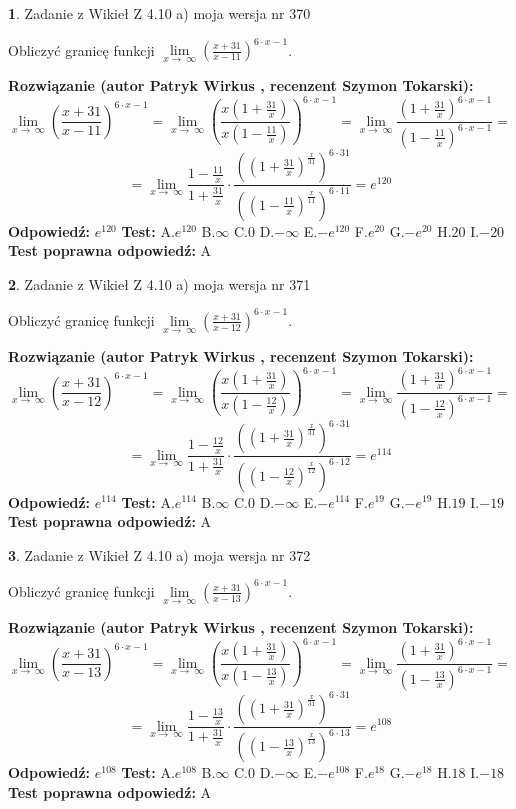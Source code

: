 \documentclass[12pt, a4paper]{article}
\theoremstyle{definition} %
\newtheorem{zad}{}
\newcommand{\zadStart}[1]{\begin{zad}#1\newline}
\newcommand{\zadStop}{\end{zad}}
\newcommand{\rozwStart}[2]{\noindent \textbf{Rozwiązanie (autor #1 , recenzent #2): }\newline}
\newcommand{\rozwStop}{\newline}
\newcommand{\odpStart}{\noindent \textbf{Odpowiedź:}\newline}
\newcommand{\odpStop}{\newline}
\newcommand{\testStart}{\noindent \textbf{Test:}\newline}
\newcommand{\testStop}{\newline}
\newcommand{\kluczStart}{\noindent \textbf{Test poprawna odpowiedź:}\newline}
\newcommand{\kluczStop}{\newline}
\begin{document}
\zadStart{Zadanie z Wikieł Z 4.10 a) moja wersja nr 370}

Obliczyć granicę funkcji  $\lim\limits_{x\to\ \infty}(\frac{x+31}{x-11})^{6\cdot x-1}$.
\zadStop
\rozwStart{Patryk Wirkus}{Szymon Tokarski}
$$\lim\limits_{x\to\ \infty}(\frac{x+31}{x-11})^{6\cdot x-1} = \lim\limits_{x\to\ \infty}(\frac{x(1+\frac{31}{x})}{x(1-\frac{11}{x})})^{6\cdot x-1}=\lim\limits_{x\to\ \infty}\frac{(1+\frac{31}{x})^{6\cdot x-1}}{(1-\frac{11}{x})^{6\cdot x-1}}=$$
$$=\lim\limits_{x\to\ \infty}\frac{1-\frac{11}{x}}{1+\frac{31}{x}}\cdot\frac{((1+\frac{31}{x})^{\frac{x}{31}})^{6\cdot31}}{((1-\frac{11}{x})^{\frac{x}{11}})^{6\cdot11}}=e^{120}$$
\rozwStop
\odpStart
$e^{120}$
\odpStop
\testStart
A.$e^{120}$ B.$\infty$ C.$0$ D.$-\infty$ E.$-e^{120}$
F.$e^{20}$ G.$-e^{20}$
H.$20$
I.$-20$
\testStop
\kluczStart
A
\kluczStop



\zadStart{Zadanie z Wikieł Z 4.10 a) moja wersja nr 371}

Obliczyć granicę funkcji  $\lim\limits_{x\to\ \infty}(\frac{x+31}{x-12})^{6\cdot x-1}$.
\zadStop
\rozwStart{Patryk Wirkus}{Szymon Tokarski}
$$\lim\limits_{x\to\ \infty}(\frac{x+31}{x-12})^{6\cdot x-1} = \lim\limits_{x\to\ \infty}(\frac{x(1+\frac{31}{x})}{x(1-\frac{12}{x})})^{6\cdot x-1}=\lim\limits_{x\to\ \infty}\frac{(1+\frac{31}{x})^{6\cdot x-1}}{(1-\frac{12}{x})^{6\cdot x-1}}=$$
$$=\lim\limits_{x\to\ \infty}\frac{1-\frac{12}{x}}{1+\frac{31}{x}}\cdot\frac{((1+\frac{31}{x})^{\frac{x}{31}})^{6\cdot31}}{((1-\frac{12}{x})^{\frac{x}{12}})^{6\cdot12}}=e^{114}$$
\rozwStop
\odpStart
$e^{114}$
\odpStop
\testStart
A.$e^{114}$ B.$\infty$ C.$0$ D.$-\infty$ E.$-e^{114}$
F.$e^{19}$ G.$-e^{19}$
H.$19$
I.$-19$
\testStop
\kluczStart
A
\kluczStop



\zadStart{Zadanie z Wikieł Z 4.10 a) moja wersja nr 372}

Obliczyć granicę funkcji  $\lim\limits_{x\to\ \infty}(\frac{x+31}{x-13})^{6\cdot x-1}$.
\zadStop
\rozwStart{Patryk Wirkus}{Szymon Tokarski}
$$\lim\limits_{x\to\ \infty}(\frac{x+31}{x-13})^{6\cdot x-1} = \lim\limits_{x\to\ \infty}(\frac{x(1+\frac{31}{x})}{x(1-\frac{13}{x})})^{6\cdot x-1}=\lim\limits_{x\to\ \infty}\frac{(1+\frac{31}{x})^{6\cdot x-1}}{(1-\frac{13}{x})^{6\cdot x-1}}=$$
$$=\lim\limits_{x\to\ \infty}\frac{1-\frac{13}{x}}{1+\frac{31}{x}}\cdot\frac{((1+\frac{31}{x})^{\frac{x}{31}})^{6\cdot31}}{((1-\frac{13}{x})^{\frac{x}{13}})^{6\cdot13}}=e^{108}$$
\rozwStop
\odpStart
$e^{108}$
\odpStop
\testStart
A.$e^{108}$ B.$\infty$ C.$0$ D.$-\infty$ E.$-e^{108}$
F.$e^{18}$ G.$-e^{18}$
H.$18$
I.$-18$
\testStop
\kluczStart
A
\kluczStop
\end{document}
